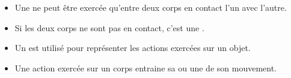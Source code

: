 \begin{mybilan}
	\begin{itemize}
		
		\item Une  ne peut être exercée qu'entre deux corps en contact l'un avec l'autre.
		
		\item Si les deux corps ne sont pas en contact, c'est une .
		
		\item Un  est utilisé pour représenter les actions exercées sur un objet.
		
		\item Une action exercée sur un corps entraine sa  ou une  de son mouvement.
	\end{itemize}
\end{mybilan}